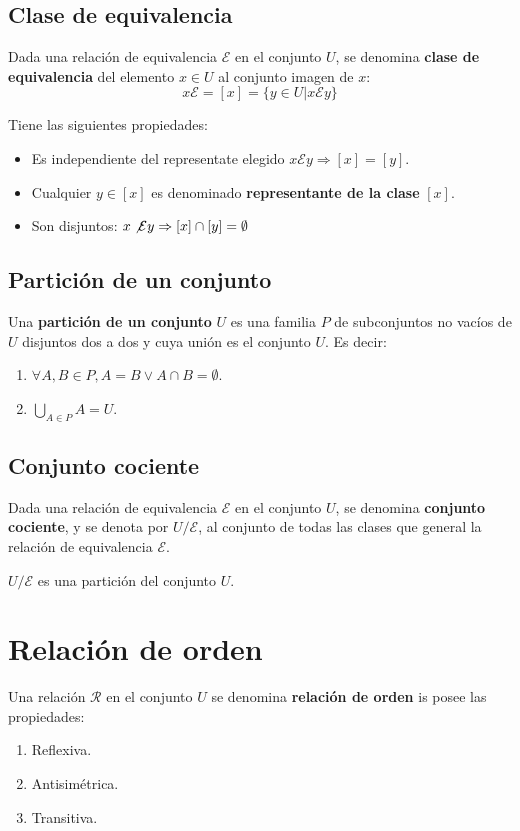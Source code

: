 \subsection{Clase de equivalencia}

Dada una relación de equivalencia $\mathcal{E}$ en el conjunto $U$, se denomina \textbf{clase de equivalencia} del elemento $x \in U$ al conjunto imagen de $x$:
\[
x\mathcal{E} = [x] = \{y \in U | x \mathcal{E} y\}
\]

Tiene las siguientes propiedades:
\begin{itemize}
\item Es independiente del representate elegido $x\mathcal{E}y \Rightarrow [x]=[y]$.
\item Cualquier $y \in [x]$ es denominado \textbf{representante de la clase} $[x]$.
\item Son disjuntos: $x \not \mathcal{E}y \Rightarrow [x] \cap [y] = \emptyset$
\end{itemize}

\subsection{Partición de un conjunto}

Una \textbf{partición de un conjunto} $U$ es una familia $P$ de subconjuntos no vacíos de $U$ disjuntos dos a dos y cuya unión es el conjunto $U$. Es decir:
\begin{enumerate}
\item $\forall A,B \in P,A=B \vee A \cap B = \emptyset$.
\item $\bigcup_{A \in P} A = U$.
\end{enumerate}

\subsection{Conjunto cociente}

Dada una relación de equivalencia $\mathcal{E}$ en el conjunto $U$, se denomina \textbf{conjunto cociente}, y se denota por $U/\mathcal{E}$, al conjunto de todas las clases que general la relación de equivalencia $\mathcal{E}$.

$U/\mathcal{E}$ es una partición del conjunto $U$.

\section{Relación de orden}

Una relación $\mathcal{R}$ en el conjunto $U$ se denomina \textbf{relación de orden} is posee las propiedades:
\begin{enumerate}
\item Reflexiva.
\item Antisimétrica.
\item Transitiva.
\end{enumerate}

